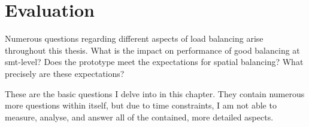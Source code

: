 \chapter{Evaluation}
\label{sec:evaluation}


Numerous questions regarding different aspects of load balancing arise
throughout this thesis.
What is the impact on performance of good balancing at \gls{smt}-level?
Does the prototype meet the expectations for spatial balancing?
What precisely are these expectations?

These are the basic questions I delve into in this chapter.
They contain numerous more questions within itself, but due to time
constraints, I am not able to measure, analyse, and answer all of the
contained, more detailed aspects.




\begin{comment}

Is behaviour aware load balancing on L4Re better than behaviour unaware
balancing?
What differences are observable between different SMT assignment schemes?

When compared with Linux \gls{cfs} scheduler, how different is the
performance?

Of interest are performance degradation compared to solo execution, when
executed in parallel with other applications.
Also, the related work suggests that the execution time is much more
deterministic, hence the maximum and minimum execution times are close
together.


\end{comment}


\cleardoublepage

